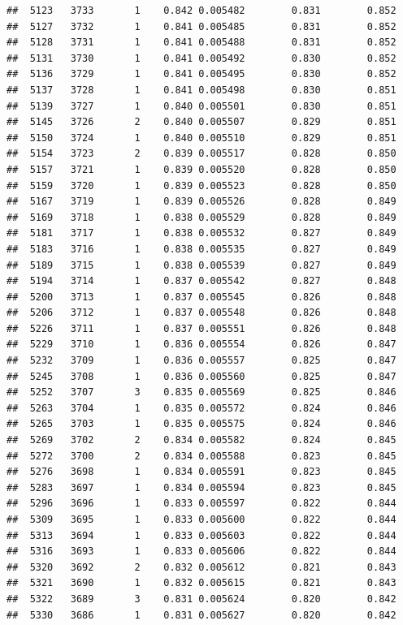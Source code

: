\documentclass[
]{book}
\begin{document}
\begin{verbatim}
##  5123   3733       1    0.842 0.005482        0.831        0.852
##  5127   3732       1    0.841 0.005485        0.831        0.852
##  5128   3731       1    0.841 0.005488        0.831        0.852
##  5131   3730       1    0.841 0.005492        0.830        0.852
##  5136   3729       1    0.841 0.005495        0.830        0.852
##  5137   3728       1    0.841 0.005498        0.830        0.851
##  5139   3727       1    0.840 0.005501        0.830        0.851
##  5145   3726       2    0.840 0.005507        0.829        0.851
##  5150   3724       1    0.840 0.005510        0.829        0.851
##  5154   3723       2    0.839 0.005517        0.828        0.850
##  5157   3721       1    0.839 0.005520        0.828        0.850
##  5159   3720       1    0.839 0.005523        0.828        0.850
##  5167   3719       1    0.839 0.005526        0.828        0.849
##  5169   3718       1    0.838 0.005529        0.828        0.849
##  5181   3717       1    0.838 0.005532        0.827        0.849
##  5183   3716       1    0.838 0.005535        0.827        0.849
##  5189   3715       1    0.838 0.005539        0.827        0.849
##  5194   3714       1    0.837 0.005542        0.827        0.848
##  5200   3713       1    0.837 0.005545        0.826        0.848
##  5206   3712       1    0.837 0.005548        0.826        0.848
##  5226   3711       1    0.837 0.005551        0.826        0.848
##  5229   3710       1    0.836 0.005554        0.826        0.847
##  5232   3709       1    0.836 0.005557        0.825        0.847
##  5245   3708       1    0.836 0.005560        0.825        0.847
##  5252   3707       3    0.835 0.005569        0.825        0.846
##  5263   3704       1    0.835 0.005572        0.824        0.846
##  5265   3703       1    0.835 0.005575        0.824        0.846
##  5269   3702       2    0.834 0.005582        0.824        0.845
##  5272   3700       2    0.834 0.005588        0.823        0.845
##  5276   3698       1    0.834 0.005591        0.823        0.845
##  5283   3697       1    0.834 0.005594        0.823        0.845
##  5296   3696       1    0.833 0.005597        0.822        0.844
##  5309   3695       1    0.833 0.005600        0.822        0.844
##  5313   3694       1    0.833 0.005603        0.822        0.844
##  5316   3693       1    0.833 0.005606        0.822        0.844
##  5320   3692       2    0.832 0.005612        0.821        0.843
##  5321   3690       1    0.832 0.005615        0.821        0.843
##  5322   3689       3    0.831 0.005624        0.820        0.842
##  5330   3686       1    0.831 0.005627        0.820        0.842

\end{verbatim}
\end{document}
